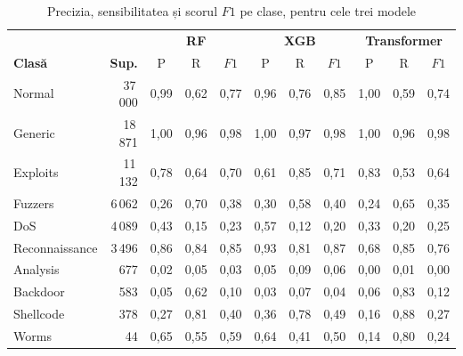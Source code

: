 \begin{table}[!ht]
    \caption{Precizia, sensibilitatea și scorul $F1$ pe clase, pentru cele trei modele}
    \centering\footnotesize
    \begin{tabular}{|l|r|ccc|ccc|ccc|}
        \hline
        & & \multicolumn{3}{c|}{\textbf{RF}} & \multicolumn{3}{c|}{\textbf{XGB}} & \multicolumn{3}{c|}{\textbf{Transformer}} \\
        \textbf{Clasă} & \textbf{Sup.} & P & R & $F1$ & P & R & $F1$ & P & R & $F1$ \\
        \hline
        Normal & 37\,000 & 0,99 & 0,62 & 0,77 & 0,96 & 0,76 & 0,85 & 1,00 & 0,59 & 0,74 \\
        \hline
        Generic & 18\,871 & 1,00 & 0,96 & 0,98 & 1,00 & 0,97 & 0,98 & 1,00 & 0,96 & 0,98 \\
        \hline
        Exploits & 11\,132 & 0,78 & 0,64 & 0,70 & 0,61 & 0,85 & 0,71 & 0,83 & 0,53 & 0,64 \\
        \hline
        Fuzzers & 6\,062 & 0,26 & 0,70 & 0,38 & 0,30 & 0,58 & 0,40 & 0,24 & 0,65 & 0,35 \\
        \hline
        DoS & 4\,089 & 0,43 & 0,15 & 0,23 & 0,57 & 0,12 & 0,20 & 0,33 & 0,20 & 0,25 \\
        \hline
        Reconnaissance & 3\,496 & 0,86 & 0,84 & 0,85 & 0,93 & 0,81 & 0,87 & 0,68 & 0,85 & 0,76 \\
        \hline
        Analysis & 677 & 0,02 & 0,05 & 0,03 & 0,05 & 0,09 & 0,06 & 0,00 & 0,01 & 0,00 \\
        \hline
        Backdoor & 583 & 0,05 & 0,62 & 0,10 & 0,03 & 0,07 & 0,04 & 0,06 & 0,83 & 0,12 \\
        \hline
        Shellcode & 378 & 0,27 & 0,81 & 0,40 & 0,36 & 0,78 & 0,49 & 0,16 & 0,88 & 0,27 \\
        \hline
        Worms & 44 & 0,65 & 0,55 & 0,59 & 0,64 & 0,41 & 0,50 & 0,14 & 0,80 & 0,24 \\
        \hline
    \end{tabular}
    \label{tab:anexa-perclasa}
\end{table}
